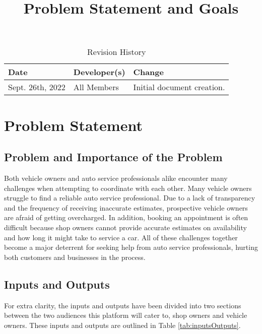 \documentclass{article}
\date{}
\begin{document}
\title{Problem Statement and Goals\\\progname}

\author{\authname}

\begin{table}[hp]
\caption{Revision History} \label{TblRevisionHistory}
\begin{tabularx}{\textwidth}{llX}
\toprule
\textbf{Date} & \textbf{Developer(s)} & \textbf{Change}\\
\midrule
Sept. 26th, 2022  & All Members & Initial document creation. \\
\bottomrule
\end{tabularx}
\end{table}
    
\newpage

\maketitle

\section{Problem Statement}

\subsection{Problem and Importance of the Problem}

Both vehicle owners and auto service professionals alike encounter many challenges when attempting to coordinate with each other. Many vehicle owners struggle to find a reliable auto service professional. Due to a lack of transparency and the frequency of receiving inaccurate estimates, prospective vehicle owners are afraid of getting overcharged. In addition, booking an appointment is often difficult because shop owners cannot provide accurate estimates on availability and how long it might take to service a car. All of these challenges together become a major deterrent for seeking help from auto service professionals, hurting both customers and businesses in the process.

\subsection{Inputs and Outputs}

For extra clarity, the inputs and outputs have been divided into two sections between the two audiences this platform will cater to, shop owners and vehicle owners. These inputs and outputs are outlined in Table \ref{tab:inputsOutputs}.
\end{document}
